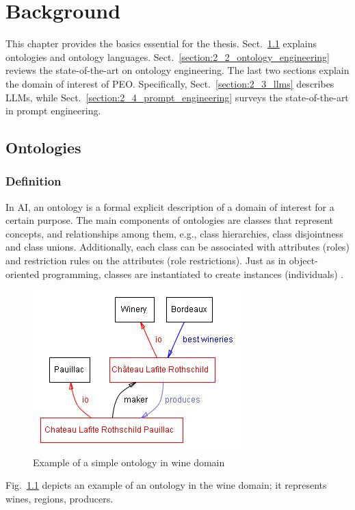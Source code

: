 \chapter{Background}
\label{chapter:background}
This chapter provides the basics essential for the thesis.
Sect.~\ref{section:2_1_ontologies} explains ontologies and ontology languages.
Sect.~\ref{section:2_2_ontology_engineering} reviews the state-of-the-art on ontology engineering.
The last two sections explain the domain of interest of PEO.
Specifically, Sect.~\ref{section:2_3_llms} describes LLMs, while Sect.~\ref{section:2_4_prompt_engineering} surveys the state-of-the-art in prompt engineering.

\section{Ontologies}
\label{section:2_1_ontologies}
\subsection{Definition}
In AI, an ontology is a formal explicit description of a domain of interest for a certain purpose.
The main components of ontologies are classes that represent concepts, and relationships among them, e.g., class hierarchies, class disjointness and class unions.
Additionally, each class can be associated with attributes (roles) and restriction rules on the attributes (role restrictions).
Just as in object-oriented programming, classes are instantiated to create instances (individuals) \cite{protege_ontology}.

\begin{figure}[H]
    \centering
    \includegraphics[width=0.5\linewidth]{Figures/fig_0.jpg}
    \caption{Example of a simple ontology in wine domain}
    \label{fig:wine_ontology}
\end{figure}
Fig.~\ref{fig:wine_ontology} depicts an example of an ontology in the wine domain; it represents wines, regions, producers.

